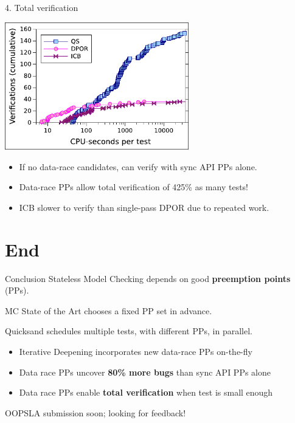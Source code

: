 \documentclass[xcolor=dvipsnames]{beamer}
\begin{document}
\begin{frame}{4. Total verification}
	\begin{center}
		\includegraphics[width=0.6\textwidth]{eval4.pdf}
	\end{center}
	\begin{itemize}
		\item If no data-race candidates, can verify with sync API PPs alone.
		\item Data-race PPs allow total verification of 425\% as many tests!
		\item ICB slower to verify than single-pass DPOR due to repeated work.
	\end{itemize}
\end{frame}


\section{End}

\begin{frame}{Conclusion}
	Stateless Model Checking depends on good {\bf preemption points} (PPs).
	\linegap

	MC State of the Art chooses a fixed PP set in advance.
	\linegap

	Quicksand schedules multiple tests, with different PPs, in parallel.
	\begin{itemize}
		\item Iterative Deepening incorporates new data-race PPs on-the-fly
		\item Data race PPs uncover {\bf 80\% more bugs} than sync API PPs alone
		\item Data race PPs enable {\bf total verification} when test is small enough
	\end{itemize}
	\linegap

	OOPSLA submission soon; looking for feedback!
\end{frame}
\end{document}
